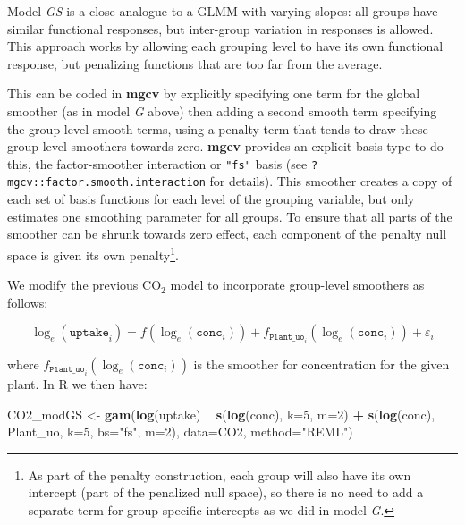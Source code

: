 \documentclass[12pt]{article}
\newenvironment{Shaded}{\begin{snugshade}}{\end{snugshade}}
\newcommand{\KeywordTok}[1]{\textcolor[rgb]{0.13,0.29,0.53}{\textbf{#1}}}
\newcommand{\DataTypeTok}[1]{\textcolor[rgb]{0.13,0.29,0.53}{#1}}
\newcommand{\DecValTok}[1]{\textcolor[rgb]{0.00,0.00,0.81}{#1}}
\newcommand{\StringTok}[1]{\textcolor[rgb]{0.31,0.60,0.02}{#1}}
\newcommand{\OperatorTok}[1]{\textcolor[rgb]{0.81,0.36,0.00}{\textbf{#1}}}
\newcommand{\NormalTok}[1]{#1}
\let\rmarkdownfootnote\footnote%
\def\footnote{\protect\rmarkdownfootnote}
\begin{document}
Model \emph{GS} is a close analogue to a GLMM with varying slopes: all
groups have similar functional responses, but inter-group variation in
responses is allowed. This approach works by allowing each grouping
level to have its own functional response, but penalizing functions that
are too far from the average.

This can be coded in \textbf{mgcv} by explicitly specifying one term for
the global smoother (as in model \emph{G} above) then adding a second
smooth term specifying the group-level smooth terms, using a penalty
term that tends to draw these group-level smoothers towards zero.
\textbf{mgcv} provides an explicit basis type to do this, the
factor-smoother interaction or \texttt{"fs"} basis (see
\texttt{?mgcv::factor.smooth.interaction} for details). This smoother
creates a copy of each set of basis functions for each level of the
grouping variable, but only estimates one smoothing parameter for all
groups. To ensure that all parts of the smoother can be shrunk towards
zero effect, each component of the penalty null space is given its own
penalty\footnote{As part of the penalty construction, each group will
  also have its own intercept (part of the penalized null space), so
  there is no need to add a separate term for group specific intercepts
  as we did in model \emph{G}.}.

We modify the previous \(\text{CO}_2\) model to incorporate group-level
smoothers as follows:

\[
\log_e(\texttt{uptake}_i) = f(\log_e(\texttt{conc}_i)) + f_{\texttt{Plant\_uo}_i}(\log_e(\texttt{conc}_i)) + \varepsilon_i
\]

where \(f_{\texttt{Plant\_uo}_i}(\log_e(\texttt{conc}_i))\) is the
smoother for concentration for the given plant. In R we then have:

\begin{Shaded}
\begin{Highlighting}[]
\NormalTok{CO2_modGS <-}\StringTok{ }\KeywordTok{gam}\NormalTok{(}\KeywordTok{log}\NormalTok{(uptake) }\OperatorTok{~}\StringTok{ }\KeywordTok{s}\NormalTok{(}\KeywordTok{log}\NormalTok{(conc), }\DataTypeTok{k=}\DecValTok{5}\NormalTok{, }\DataTypeTok{m=}\DecValTok{2}\NormalTok{) }\OperatorTok{+}\StringTok{ }
\StringTok{                   }\KeywordTok{s}\NormalTok{(}\KeywordTok{log}\NormalTok{(conc), Plant_uo, }\DataTypeTok{k=}\DecValTok{5}\NormalTok{,  }\DataTypeTok{bs=}\StringTok{"fs"}\NormalTok{, }\DataTypeTok{m=}\DecValTok{2}\NormalTok{),}
                 \DataTypeTok{data=}\NormalTok{CO2, }\DataTypeTok{method=}\StringTok{"REML"}\NormalTok{)}
\end{Highlighting}
\end{Shaded}
\end{document}
